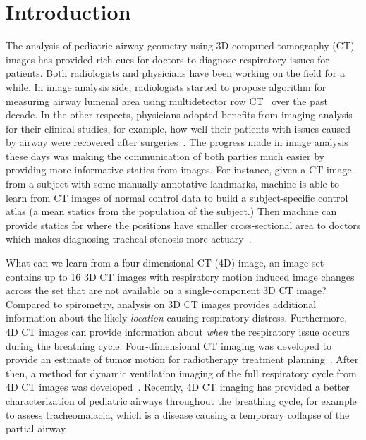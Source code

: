\section{Introduction}
\label{sec:intro}

The analysis of pediatric airway geometry using 3D computed tomography (CT) images has provided rich cues for doctors to diagnose respiratory issues for patients.
Both radiologists and physicians have been working on the field for a while.
In image analysis side, radiologists started to propose algorithm for measuring airway lumenal area using multidetector row CT~\cite{nakano2002development} over the past decade.
In the other respects, physicians adopted benefits from imaging analysis for their clinical studies, for example, how well their patients with issues caused by airway were recovered after surgeries~\cite{abramson2011three}.
The progress made in image analysis these days was making the communication of both parties much easier by providing more informative statics from images.
For instance, given a CT image from a subject with some manually annotative landmarks, machine is able to learn from CT images of normal control data to build a subject-specific control atlas (a mean statics from the population of the subject.) 
Then machine can provide statics for where the positions have smaller cross-sectional area to doctors which makes diagnosing tracheal stenosis more actuary~\cite{hong2014statistical}.

What can we learn from a four-dimensional CT (4D) image, an image set contains up to 16 3D CT images with respiratory motion induced image changes across the set that are not available on a single-component 3D CT image?
Compared to spirometry, analysis on 3D CT images provides additional information about the likely {\it location} causing respiratory distress.
Furthermore, 4D CT images can provide information about {\it when} the respiratory issue occurs during the breathing cycle.
Four-dimensional CT imaging was developed to provide an estimate of tumor motion for radiotherapy treatment planning~\cite{ford2003respiration}.
After then, a method for dynamic ventilation imaging of the full respiratory cycle from 4D CT images was developed~\cite{guerrero2006dynamic}.
Recently, 4D CT imaging has provided a better characterization of pediatric airways throughout the breathing cycle, for example to assess tracheomalacia, which is a disease causing a temporary collapse of the partial airway.

